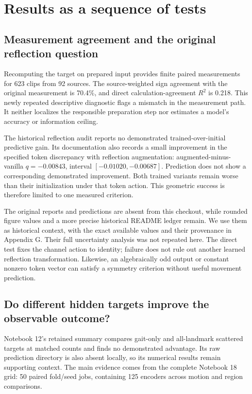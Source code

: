 \documentclass{article}
\begin{document}
\section{Results as a sequence of tests}\label{results-as-a-sequence-of-tests}

\subsection{Measurement agreement and the original reflection question}\label{measurement-agreement-and-the-original-reflection-question}

Recomputing the target on prepared input provides finite paired measurements for 623 clips from 92 sources. The source-weighted sign agreement with the original measurement is 70.4\%, and direct calculation-agreement \(R^2\) is 0.218. This newly repeated descriptive diagnostic flags a mismatch in the measurement path. It neither localizes the responsible preparation step nor estimates a model's accuracy or information ceiling.

The historical reflection audit reports no demonstrated trained-over-initial predictive gain. Its documentation also records a small improvement in the specified token discrepancy with reflection augmentation: augmented-minus-vanilla \(q=-0.00843\), interval \([-0.01020,-0.00687]\). Prediction does not show a corresponding demonstrated improvement. Both trained variants remain worse than their initialization under that token action. This geometric success is therefore limited to one measured criterion.

The original reports and predictions are absent from this checkout, while rounded figure values and a more precise historical README ledger remain. We use them as historical context, with the exact available values and their provenance in Appendix G. Their full uncertainty analysis was not repeated here. The direct test fixes the channel action to identity; failure does not rule out another learned reflection transformation. Likewise, an algebraically odd output or constant nonzero token vector can satisfy a symmetry criterion without useful movement prediction.

\subsection{Do different hidden targets improve the observable outcome?}\label{do-different-hidden-targets-improve-the-observable-outcome}

Notebook 12's retained summary compares gait-only and all-landmark scattered targets at matched counts and finds no demonstrated advantage. Its raw prediction directory is also absent locally, so its numerical results remain supporting context. The main evidence comes from the complete Notebook 18 grid: 50 paired fold/seed jobs, containing 125 encoders across motion and region comparisons.
\end{document}
